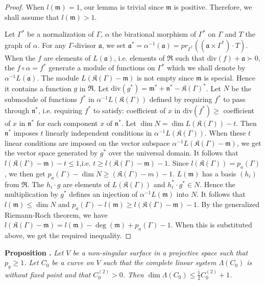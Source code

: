 \begin{proof}
When $l(\mathfrak{m})=1$, our lemma is trivial since $\mathfrak{m}$ is positive. Therefore, we shall assume that $l(\mathfrak{m})>1$.

Let $\Gamma^{*}$ be a normalization of $\Gamma$, $\alpha$ the birational morphism of $\Gamma^{*}$ on $\Gamma$ and $T$ the graph of $\alpha$. For any $\Gamma$-divisor $\mathfrak{a}$, we set $\mathfrak{a}^{*}=\alpha^{-1}(\mathfrak{a})=pr_{\Gamma^{*}}((\mathfrak{a}\times \Gamma^{*})\cdot T)$. When the $f$ are elements of $L(\mathfrak{a})$, i.e. elements of $\mathfrak{R}$ such that $\text{div} (f)+\mathfrak{a}\succ 0$, the $f\circ \alpha=f^{*}$ generate a module of functions on $\Gamma^{*}$ which we shall denote by $\alpha^{-1}L(\mathfrak{a})$. The module $L(\mathfrak{K}(\Gamma)-\mathfrak{m})$ is not empty since $\mathfrak{m}$ is special. Hence it contains a function $g$ in $\mathfrak{R}$. Let $\text{div}(g^{*})=\mathfrak{m}^{*}+\mathfrak{n}^{*}-\mathfrak{K}(\Gamma)^{*}$. Let $N$ be the submodule of functions $f^{*}$ in $\alpha^{-1}L(\mathfrak{K}(\Gamma))$ defined by requiring $f^{*}$ to pass through $\mathfrak{n}^{*}$, i.e. requiring $f^{*}$ to satisfy: coefficient of $x$ in $\text{div} (f^{*})\geq $ coefficient of $x$ in $\mathfrak{n}^{*}$ for each component $x$ of $\mathfrak{n}^{*}$. Let $\dim N=\dim L(\mathfrak{K}(\Gamma))-t$. Then $\mathfrak{n}^{*}$ imposes $t$ linearly independent conditions in $\alpha^{-1}L(\mathfrak{K}(\Gamma))$. When these $t$ linear conditions are imposed on the vector subspace $\alpha^{-1}L(\mathfrak{K}(\Gamma)-\mathfrak{m})$, we get the vector space generated by $g^{*}$ over the universal domain. It follows that $l(\mathfrak{K}(\Gamma)-\mathfrak{m})-t\leq 1$,\pageoriginale i.e. $t\geq l(\mathfrak{K}(\Gamma)-\mathfrak{m})-1$. Since $l(\mathfrak{K}(\Gamma))=p_{a}(\Gamma)$, we then get $p_{a}(\Gamma)-\dim N\geq (\mathfrak{K}(\Gamma)-m)-1$. $L(\mathfrak{m})$ has a basis $(h_{i})$ from $\mathfrak{R}$. The $h_{i}\cdot g$ are elements of $L(\mathfrak{K}(\Gamma))$ and $h_{i}^{*}\cdot g^{*}\in N$. Hence the multiplication by $g^{*}$ defines an injection of $\alpha^{-1}L(\mathfrak{m})$ into $N$. It follows that $l(\mathfrak{m})\leq \dim N$ and $p_{a}(\Gamma)-l(\mathfrak{m})\geq l(\mathfrak{K}(\Gamma)-\mathfrak{m})-1$. By the generalized Riemann-Roch theorem, we have $l(\mathfrak{K}(\Gamma)-\mathfrak{m})=l(\mathfrak{m})-\deg (\mathfrak{m})+p_{a}(\Gamma)-1$. When this is substituted above, we get the required inequality.
\end{proof}

\medskip
\noindent
{\bf Proposition .\label{art14-prop2}}
{\em Let $V$ be a non-singular surface in a projective space such that $p_{g}\geq 1$. Let $C_{0}$ be a curve on $V$ such that the complete linear system $\Lambda (C_{0})$ is without fixed point and that $C^{(2)}_{0}>0$. Then $\dim \Lambda (C_{0})\leq \frac{1}{2}C^{(2)}_{0}+1$.}

